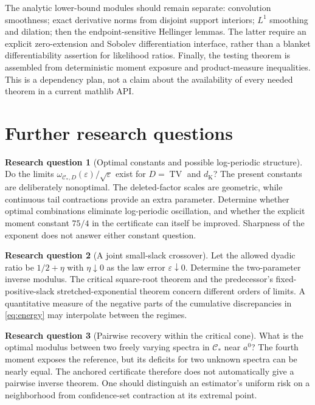 \documentclass[11pt,a4paper]{article}
\numberwithin{equation}{section}
\theoremstyle{definition}
\newtheorem{question}{Research question}
\theoremstyle{remark}
\DeclareMathOperator{\TV}{TV}
\newcommand{\C}{\mathcal C}
\newcommand{\eps}{\varepsilon}
\newcommand{\dK}{d_{\mathrm K}}
\begin{document}
The analytic lower-bound modules should remain separate: convolution
smoothness; exact derivative norms from disjoint support interiors; $L^1$
smoothing and dilation; then the endpoint-sensitive Hellinger lemmas.
The latter require an explicit zero-extension and Sobolev differentiation
interface, rather than a blanket differentiability assertion for likelihood
ratios. Finally, the testing theorem is assembled from deterministic moment
exposure and product-measure inequalities. This is a dependency plan, not a
claim about the availability of every needed theorem in a current mathlib API.

\section{Further research questions}
\label{sec:further}

\begin{question}[Optimal constants and possible log-periodic structure]
Do the limits $\omega_{\C_*,D}(\eps)/\sqrt\eps$ exist for $D=\TV$ and
$\dK$? The present constants are deliberately nonoptimal. The deleted-factor
scales are geometric, while continuous tail contractions provide an extra
parameter. Determine whether optimal combinations eliminate log-periodic
oscillation, and whether the explicit moment constant $75/4$ in the certificate
can itself be improved. Sharpness of the exponent does not answer either
constant question.
\end{question}

\begin{question}[A joint small-slack crossover]
Let the allowed dyadic ratio be $1/2+\eta$ with $\eta\downarrow0$ as the
law error $\eps\downarrow0$. Determine the two-parameter inverse modulus.
The critical square-root theorem and the predecessor's fixed-positive-slack
stretched-exponential theorem concern different orders of limits. A
quantitative measure of the negative parts of the cumulative discrepancies
in \eqref{eq:energy} may interpolate between the regimes.
\end{question}

\begin{question}[Pairwise recovery within the critical cone]
What is the optimal modulus between two freely varying spectra in $\C_*$
near $a^0$? The fourth moment exposes the reference, but its deficits for two
unknown spectra can be nearly equal. The anchored certificate therefore does
not automatically give a pairwise inverse theorem. One should distinguish
an estimator's uniform risk on a neighborhood from confidence-set contraction
at its extremal point.
\end{question}
\end{document}
